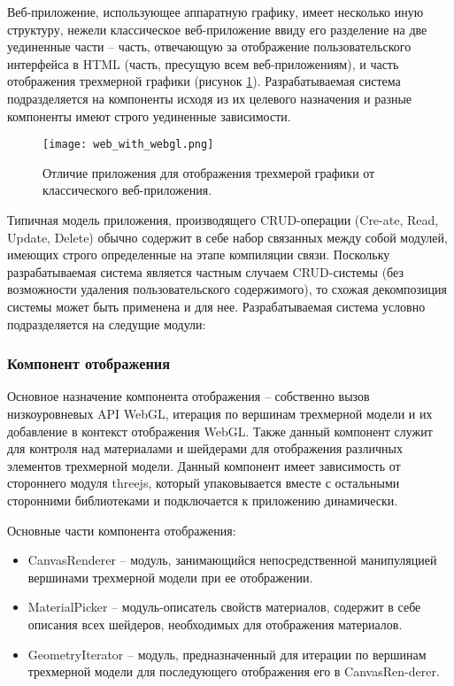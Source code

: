 Веб-приложение, использующее аппаратную графику, имеет несколько иную структуру, нежели классическое веб-приложение ввиду его разделение на две уединенные части -- часть,
отвечающую за отображение пользовательского интерфейса в HTML (часть, пресущую всем веб-приложениям), и часть отображения трехмерной графики (рисунок \ref{figure:theory:webgl_app}).
Разрабатываемая система подразделяется на компоненты исходя из их целевого назначения и разные компоненты имеют строго уединенные зависимости.

\begin{figure}[ht]
\centering
  \texttt{[image: web\_with\_webgl.png]}
  \caption{Отличие приложения для отображения трехмерой графики от классического веб-приложения.}
  \label{figure:theory:webgl_app}
\end{figure}

Типичная модель приложения, производящего CRUD-операции (Cre-ate, Read, Update, Delete) обычно содержит в себе набор связанных между собой модулей,
имеющих строго определенные на этапе компиляции связи. Поскольку разрабатываемая система является частным случаем CRUD-системы (без возможности удаления
пользовательского содержимого), то схожая декомпозиция системы может быть применена и для нее. Разрабатываемая система условно подразделяется на следущие модули:

\subsubsection{Компонент отображения}
\label{sub:theory:components:rendering}

Основное назначение компонента отображения -- собственно вызов низкоуровневых API WebGL, итерация по вершинам трехмерной модели и их добавление в контекст
отображения WebGL. Также данный компонент служит для контроля над материалами и шейдерами для отображения различных элементов трехмерной модели.
Данный компонент имеет зависимость от стороннего модуля threejs, который упаковывается вместе с остальными сторонними библиотеками и подключается к
приложению динамически.

Основные части компонента отображения:

\begin{itemize}
\item CanvasRenderer -- модуль, занимающийся непосредственной манипуляцией вершинами трехмерной модели при ее отображении.
\item MaterialPicker -- модуль-описатель свойств материалов, содержит в себе описания всех шейдеров, необходимых для отображения материалов.
\item GeometryIterator -- модуль, предназначенный для итерации по вершинам трехмерной модели для последующего отображения его в CanvasRen-derer.
\end{itemize}

